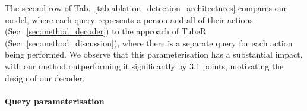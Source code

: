 \documentclass[10pt,twocolumn,letterpaper]{article}
\def \paravspace {-0.7\baselineskip}
\begin{document}
The second row of Tab.~\ref{tab:ablation_detection_architectures} compares our model, where each query represents a person and all of their actions (Sec.~\ref{sec:method_decoder}) to the approach of TubeR~\cite{zhao2022tuber} (Sec.~\ref{sec:method_discussion}), where there is a separate query for each action being performed.
We observe that this parameterisation has a substantial impact, with our method outperforming it significantly by 3.1 points, motivating the design of our decoder.


\vspace{\paravspace}
\paragraph{Query parameterisation}

\begin{table}
    \centering
    \caption{Comparison of independent and factorised queries on the AVA and UCF101-24 datasets. Factorised queries are particularly beneficial for predicting tubelets, as shown by the VideoAP on UCF101-24 which has full tube annotations. Both models use tubelet matching in the loss.
	}
	\vspace{-0.5\baselineskip}
\label{tab:ablation_queries}
\end{table}
\end{document}
